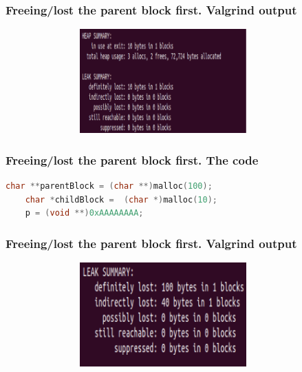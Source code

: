 \documentclass[10pt,xcolor={usenames,dvipsnames}]{beamer}
\begin{document}
\begin{frame}[fragile]
	\frametitle{Freeing/lost the parent block first. Valgrind output}
	\begin{center}
		\begin{figure}
			\includegraphics[height=4cm,width=10cm]{freeing-parent-block-first-valgrind.png}
		\end{figure}
	\end{center}
\end{frame}

\begin{frame}[fragile]
\frametitle{Freeing/lost the parent block first. The code} 
	\begin{center}
		\begin{lstlisting}[language=C++]
	char **parentBlock = (char **)malloc(100);
	char *childBlock =  (char *)malloc(10);
	p = (void **)0xAAAAAAAA;
		\end{lstlisting}
	\end{center}
\end{frame}

\begin{frame}[fragile]
	\frametitle{Freeing/lost the parent block first. Valgrind output}
	\begin{center}
		\begin{figure}
			\includegraphics[height=4cm,width=10cm]{freeing-parent-block-first-valgrind-indir.png}
		\end{figure}
	\end{center}
\end{frame}
\end{document}
